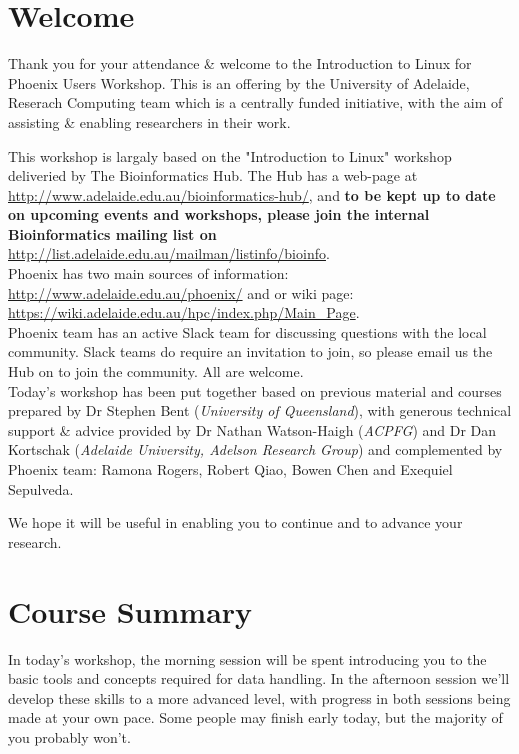 %
%
\newpage
\section{Welcome}
Thank you for your attendance \& welcome to the Introduction to Linux for Phoenix Users Workshop.
This is an offering by the University of Adelaide, Reserach Computing team which is a centrally funded initiative, with the aim of assisting \& enabling researchers in their work.

This workshop is largaly based on the "Introduction to Linux" workshop deliveried by The Bioinformatics Hub. The Hub has a web-page at \url{http://www.adelaide.edu.au/bioinformatics-hub/}, and \textbf{to be kept up to date on upcoming events and workshops, please join the internal Bioinformatics mailing list on}
\url{http://list.adelaide.edu.au/mailman/listinfo/bioinfo}.\\

Phoenix has two main sources of information: \url{http://www.adelaide.edu.au/phoenix/} and or wiki page: \url{https://wiki.adelaide.edu.au/hpc/index.php/Main_Page}. \\

Phoenix team has an active Slack team for discussing questions with the local community.
Slack teams do require an invitation to join, so please email us the Hub on  to join the community.
All are welcome.\\

Today's workshop has been put together based on previous material and courses prepared by Dr Stephen Bent (\textit{University of Queensland}), with generous technical support \& advice provided by Dr Nathan Watson-Haigh (\textit{ACPFG}) and Dr Dan Kortschak (\textit{Adelaide University, Adelson Research Group}) and complemented by Phoenix team: Ramona Rogers, Robert Qiao, Bowen Chen and Exequiel Sepulveda. 

We hope it will be useful in enabling you to continue and to advance your research.\\

\section{Course Summary}
In today's workshop, the morning session will be spent introducing you to the basic tools and concepts required for data handling.
In the afternoon session we'll develop these skills to a more advanced level, with progress in both sessions being made at your own pace.
Some people may finish early today, but the majority of you probably won't.

